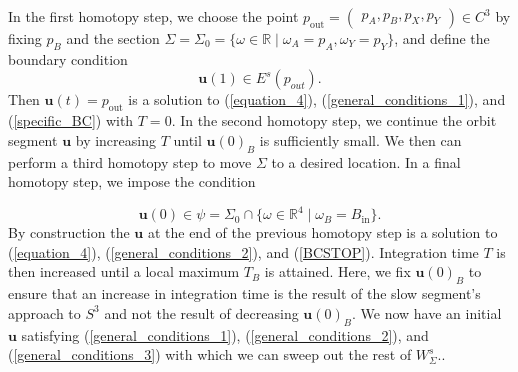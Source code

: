 \documentclass{ws-ijbc}
\begin{document}
In the first homotopy step, we choose the point $p_{\text{out}}=\begin{pmatrix} p_A, p_B, p_X, p_Y \end{pmatrix}  \in C^3$ by fixing $p_B$ and the section $\Sigma=\Sigma_0=\{\omega \in \mathbb{R} \; | \;  \omega_A=p_A, \omega_Y=p_Y\}$, and define the boundary condition
\begin{equation}
	\mathbf{u}(1) \in E^s(p_{out}).
	\label{specific_BC}
\end{equation}
Then $\mathbf{u}(t)=p_{\text{out}}$ is a solution to (\ref{equation_4}), (\ref{general_conditions_1}), and (\ref{specific_BC}) with $T=0$.  In the second homotopy step, we continue the orbit segment $\mathbf{u}$ by increasing $T$ until $\mathbf{u}(0)_B$ is sufficiently small.  We then can perform a third homotopy step to move $\Sigma$ to a desired location.  In a final homotopy step, we impose the condition

\begin{equation}
	\mathbf{u}(0) \in \psi=\Sigma_{0} \cap \{ \omega \in \mathbb{R}^4 \; | \; \omega_B = B_{\text{in}} \}.
	\label{BCSTOP}
\end{equation}
By construction the $\mathbf{u}$ at the end of the previous homotopy step is a solution to (\ref{equation_4}), (\ref{general_conditions_2}), and (\ref{BCSTOP}).  Integration time $T$ is then increased until a local maximum $T_B$ is attained.  Here, we fix $\mathbf{u}(0)_B$ to ensure that an increase in integration time is the result of the slow segment's approach to $S^3$ and not the result of decreasing $\mathbf{u}(0)_B$.  We now have an initial $\mathbf{u}$ satisfying (\ref{general_conditions_1}), (\ref{general_conditions_2}), and (\ref{general_conditions_3}) with which we can sweep out the rest of $W^s_\Sigma$..
\end{document}
